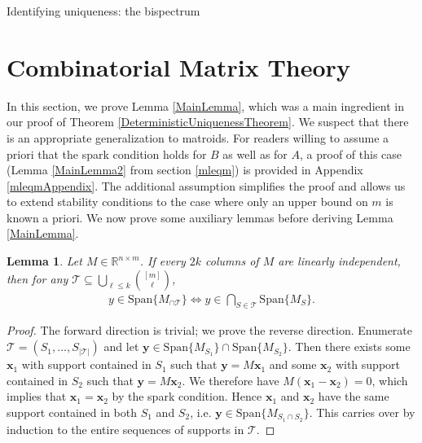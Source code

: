 \documentclass[journal, onecolumn]{IEEEtran}
\newtheorem{lemma}{Lemma}
\begin{document}
Identifying uniqueness: the bispectrum


\appendices
\section{Combinatorial Matrix Theory}

In this section, we prove Lemma \ref{MainLemma}, which was a main ingredient in our proof of Theorem \ref{DeterministicUniquenessTheorem}. We suspect that there is an appropriate generalization to matroids. For readers willing to assume a priori that the spark condition holds for $B$ as well as for $A$, a proof of this case (Lemma \ref{MainLemma2} from section \ref{mleqm}) is provided in Appendix \ref{mleqmAppendix}. The additional assumption simplifies the proof and allows us to extend stability conditions to the case where only an upper bound on $m$ is known a priori. We now prove some auxiliary lemmas before deriving Lemma \ref{MainLemma}.


\begin{lemma}\label{SpanIntersectionLemma}
Let $M \in \mathbb{R}^{n \times m}$. If every $2k$ columns of $M$ are linearly independent, then for any $\mathcal{T} \subseteq \bigcup_{\ell \leq k} {[m] \choose \ell}$,
\begin{align}
y \in \text{Span}\{M_{\cap \mathcal{T}}\}  \Longleftrightarrow y \in \bigcap_{S \in \mathcal{T}} \text{Span}\{M_S\}.
\end{align}
\end{lemma}

\begin{proof}The forward direction is trivial; we prove the reverse direction. Enumerate $\mathcal{T} = (S_1, \ldots, S_{|\mathcal{T}|})$ and let $\mathbf{y} \in \text{Span}\{M_{S_1}\} \cap \text{Span}\{M_{S_2}\}$. Then there exists some $\mathbf{x}_1$ with support contained in $S_1$ such that $\mathbf{y} = M\mathbf{x}_1$ and some $\mathbf{x}_2$ with support contained in $S_2$ such that $\mathbf{y} = M\mathbf{x}_2$. We therefore have $M(\mathbf{x}_1 - \mathbf{x}_2) = 0$, which implies that $\mathbf{x}_1 = \mathbf{x}_2$ by the spark condition. Hence $\mathbf{x}_1$ and $\mathbf{x}_2$ have the same support contained in both $S_1$ and $S_2$, i.e. $\mathbf{y} \in \text{Span}\{M_{S_1 \cap S_2}\}$. This carries over by induction to the entire sequences of supports in $\mathcal{T}$. 
\end{proof}
\end{document}
